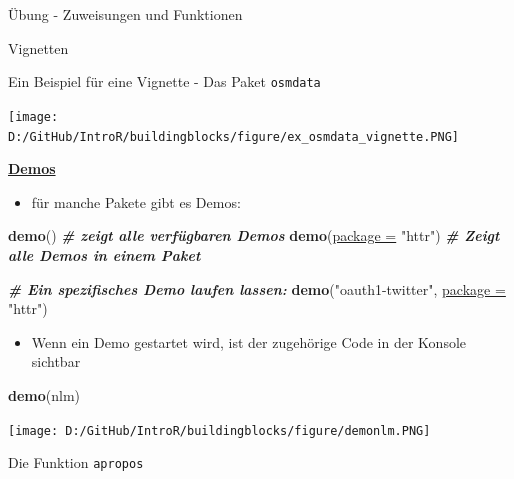 \documentclass[ignorenonframetext,]{beamer}
\newenvironment{Shaded}{\begin{snugshade}}{\end{snugshade}}
\newcommand{\CommentTok}[1]{\textcolor[rgb]{0.00,0.40,1.00}{\textbf{\textit{#1}}}}
\newcommand{\DataTypeTok}[1]{\textcolor[rgb]{0.74,0.68,0.62}{\underline{#1}}}
\newcommand{\KeywordTok}[1]{\textcolor[rgb]{0.26,0.66,0.93}{\textbf{#1}}}
\newcommand{\NormalTok}[1]{\textcolor[rgb]{0.74,0.68,0.62}{#1}}
\newcommand{\StringTok}[1]{\textcolor[rgb]{0.02,0.61,0.04}{#1}}
\providecommand{\tightlist}{%
  \setlength{\itemsep}{0pt}\setlength{\parskip}{0pt}}
\begin{document}
\begin{frame}[fragile]{Übung - Zuweisungen und Funktionen}
\begin{frame}[fragile]{Vignetten}
\end{frame}

\begin{frame}{Ein Beispiel für eine Vignette - Das Paket
\texttt{osmdata}}
\protect\hypertarget{ein-beispiel-fur-eine-vignette---das-paket-osmdata}{}

\texttt{[image: D:/GitHub/IntroR/buildingblocks/figure/ex\_osmdata\_vignette.PNG]}

\end{frame}

\begin{frame}[fragile]{\href{http://r-pkgs.had.co.nz/demo.html}{\textbf{Demos}}}
\protect\hypertarget{demos}{}

\begin{itemize}
\tightlist
\item
  für manche Pakete gibt es Demos:
\end{itemize}

\begin{Shaded}
\begin{Highlighting}[]
\KeywordTok{demo}\NormalTok{() }\CommentTok{# zeigt alle verfügbaren Demos}
\KeywordTok{demo}\NormalTok{(}\DataTypeTok{package =} \StringTok{"httr"}\NormalTok{) }\CommentTok{# Zeigt alle Demos in einem Paket}

\CommentTok{# Ein spezifisches Demo laufen lassen:}
\KeywordTok{demo}\NormalTok{(}\StringTok{"oauth1-twitter"}\NormalTok{, }\DataTypeTok{package =} \StringTok{"httr"}\NormalTok{) }
\end{Highlighting}
\end{Shaded}

\begin{itemize}
\tightlist
\item
  Wenn ein Demo gestartet wird, ist der zugehörige Code in der Konsole
  sichtbar
\end{itemize}

\begin{Shaded}
\begin{Highlighting}[]
\KeywordTok{demo}\NormalTok{(nlm)}
\end{Highlighting}
\end{Shaded}

\texttt{[image: D:/GitHub/IntroR/buildingblocks/figure/demonlm.PNG]}

\end{frame}

\begin{frame}[fragile]{Die Funktion \texttt{apropos}}
\protect\hypertarget{die-funktion-apropos}{}


\end{frame}
\end{frame}
\end{document}
